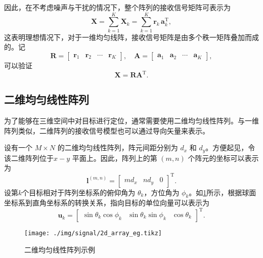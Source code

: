 因此，在不考虑噪声与干扰的情况下，整个阵列的接收信号矩阵可表示为
\[
    \mathbf{X}
    = \sum_{k=1}^{K} \mathbf{X}_k
    = \sum_{k=1}^{K} \bm{r}_k \, \bm{a}_k^{\mathrm{T}},
\]
这表明理想情况下，对于一维均匀线阵，接收信号矩阵是由多个秩一矩阵叠加而成的。记
\[
    \mathbf{R} = \begin{bmatrix}
        \bm{r}_1 & \bm{r}_2 & \cdots & \bm{r}_K
    \end{bmatrix}, \quad \mathbf{A} = \begin{bmatrix}
        \bm{a}_1 & \bm{a}_2 & \cdots & \bm{a}_K
    \end{bmatrix},
\]
可以验证
\[
    \mathbf{X} = \mathbf{R} \mathbf{A}^{\mathrm{T}}.
\]

\subsection{二维均匀线性阵列}
为了能够在三维空间中对目标进行定位，通常需要使用二维均匀线性阵列。与一维阵列类似，二维阵列的接收信号模型也可以通过导向矢量来表示。

设有一个 \(M \times N\) 的二维均匀线性阵列，阵元间距分别为 \(d_x\) 和 \(d_y\)。方便起见，令该二维阵列位于\( x-y \) 平面上。因此，阵列上的第 \( (m,n) \) 个阵元的坐标可以表示为
\[
    \bm{l}^{(m, n)} = \begin{bmatrix}
        m d_x & n d_y & 0
    \end{bmatrix}^{\mathrm{T}}.
\]
设第\( k \)个目标相对于阵列坐标系的俯仰角为 \(\theta_k\)，方位角为 \(\phi_k\)。如\cref{fig_2d_array_eg}所示，根据球面坐标系到直角坐标系的转换关系，指向目标的单位向量可以表示为
\[
    \bm{u}_k = \begin{bmatrix}
        \sin\theta_k \cos\phi_k & \sin\theta_k \sin\phi_k & \cos\theta_k
    \end{bmatrix}^{\mathrm{T}}.
\]

\begin{figure}[htb!]
    \centering
    \texttt{[image: ./img/signal/2d\_array\_eg.tikz]}
    \caption{二维均匀线性阵列示例}
    \label{fig_2d_array_eg}
\end{figure}

